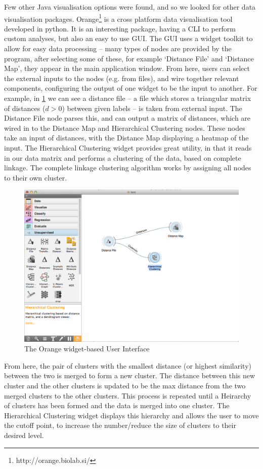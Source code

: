 Few other Java visualisation options were found, and so we looked for other
data visualisation packages. Orange\footnote{http://orange.biolab.si/} is a cross platform data
visualisation tool developed in python. It is an interesting package, having
a CLI to perform custom analyses, but also an easy to use GUI. The GUI uses
a widget toolkit to allow for easy data processing -- many types of nodes
are provided by the program, after selecting some of these, for example `Distance
File' and `Distance Map', they appear in the main application window. From here,
users can select the external inputs to the nodes (e.g. from files), and wire
together relevant components, configuring the output of one widget to be the
input to another. For example, in \cref{fig:orangeUI} we can see a distance file
-- a file which stores a triangular matrix of distances ($d>0$) between given labels --
is taken from external input. The Distance File node parses this, and can output
a matrix of distances, which are wired in to the Distance Map and Hierarchical Clustering
nodes. These nodes take an input of distances, with the Distance Map displaying a heatmap
of the input. The Hierarchical Clustering widget provides great utility, in that
it reads in our data matrix and performs a clustering of the data, based on
complete linkage. The complete linkage clustering algorithm works by assigning
all nodes to their own cluster. 
\begin{figure}[H]
	\centering
		\includegraphics[width=\textwidth]{Figures/OrangeUI}
	\caption{The Orange widget-based User Interface}
	\label{fig:orangeUI}
\end{figure}
From here, the pair of clusters with the smallest
distance (or highest similarity) between the two is merged to form a new cluster.
The distance between this new cluster and the other clusters is updated to be
the max distance from the two merged clusters to the other clusters. This process
is repeated until a Heirarchy of clusters has been formed and the data is merged
into one cluster. The Hierarchical Clustering widget displays this hierarchy
and allows the user to move the cutoff point, to increase the number/reduce the
size of clusters to their desired level.


